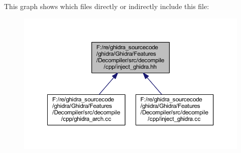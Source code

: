 This graph shows which files directly or indirectly include this file\+:
\nopagebreak
\begin{figure}[H]
\begin{center}
\leavevmode
\includegraphics[width=350pt]{inject__ghidra_8hh__dep__incl}
\end{center}
\end{figure}
